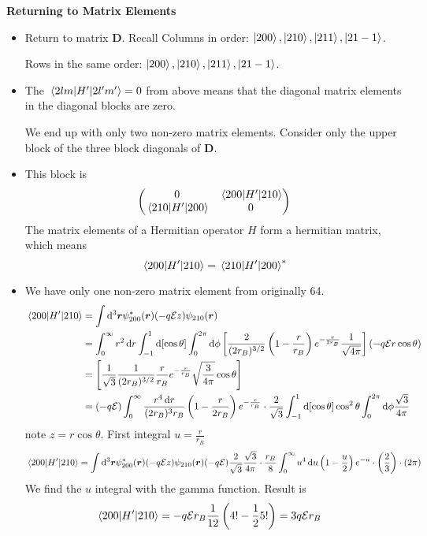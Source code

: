 \documentclass[11pt, a4paper]{article}
\newcommand{\diff}{\mathop{}\!\mathrm{d}} %
\renewcommand{\vec}[1]{\bm{#1}} %
\newcommand{\mat}[1]{\mathbf{#1}} %
\renewcommand{\r}{\vec{r}}  %
\newcommand{\E}{\mathcal{E}}  %
\begin{document}
\textbf{Returning to Matrix Elements}
\begin{itemize}
	\item Return to matrix $ \mat{D} $.  Recall
	Columns in order: $ \ket{200}, \ket{210}, \ket{211}, \ket{21-1} $. 
	
	Rows in the same order: $ \ket{200}, \ket{210}, \ket{211}, \ket{21-1} $. 
	
	\item The $ \mel{2lm}{H'}{2l'm'} = 0  $ from above means that the diagonal matrix elements in the diagonal blocks are zero. 
	
	We end up with only two non-zero matrix elements. Consider only the upper block of the three block diagonals of $ \mat{D} $. 
	
	\item This block is
	\begin{equation*}
		\begin{pmatrix}
		0 & \mel{200}{H'}{210}\\
		\mel{210}{H'}{200} & 0
		\end{pmatrix}
	\end{equation*}
	The matrix elements of a Hermitian operator $ H $ form a hermitian matrix, which means
	\begin{equation*}
		\mel{200}{H'}{210} = \mel{210}{H'}{200}^{*}
	\end{equation*}
	
	\item We have only one non-zero matrix element from originally 64.
	\begin{align*}
		\mel{200}{H'}{210} &= \int \diff^{3}\vec{r} \psi_{200}^{*}(\r) (-q \E z)\psi_{210}(\r)\\
		& = \int_{0}^{\infty}r^{2} \diff r \int_{-1}^{1}\diff [\cos \theta] \int_{0}^{2\pi}\diff \phi\left[ \frac{2}{(2r_{B})^{3/2}}\left(1 - \frac{r}{r_{B}}\right)e^{-\frac{r}{2r_{B}}}\frac{1}{\sqrt{4\pi}}\right](-q\E r\cos \theta)\\
		& = \left[\frac{1}{\sqrt{3}}\frac{1}{(2r_{B})^{3/2}} \frac{r}{r_{B}}e^{-\frac{r}{r_{B}}} \sqrt{\frac{3}{4\pi}} \cos \theta\right]\\
		& = (- q \E)\int_{0}^{\infty}\frac{r^{4}\diff r}{(2r_{B})^{3} r_{B}}\left(1 - \frac{r}{2r_{B}}\right)e^{-\frac{r}{r_{B}}} \cdot \frac{2}{\sqrt{3}}\int_{-1}^{1}\diff [\cos \theta] \cos^{2}\theta \int_{0}^{2\pi} \diff \phi \frac{\sqrt{3}}{4\pi}\\
	\end{align*}
	note $ z = r \cos \theta $. First integral $ u = \frac{r}{r_{B}} $
	\begin{align*}
		\mel{200}{H'}{210} &= \int \diff^{3}\vec{r} \psi_{200}^{*}(\r) (-q \E z)\psi_{210}(\r)	(-q\E)\frac{2}{\sqrt{3}}\frac{\sqrt{3}}{4\pi} \cdot \frac{r_{B}}{8} \int_{0}^{\infty}u^{4}\diff u\left(1 - \frac{u}{2}\right)e^{-u} \cdot \left(\frac{2}{3}\right) \cdot \left(2\pi\right)\\
	\end{align*}
	We find the $ u $ integral with the gamma function. Result is
	\begin{align*}
			\mel{200}{H'}{210} & = -q\E r_{B}\frac{1}{12}\left(4! - \frac{1}{2}5!\right) = 3q\E r_{B}
	\end{align*}
	

\end{itemize}
\end{document}
